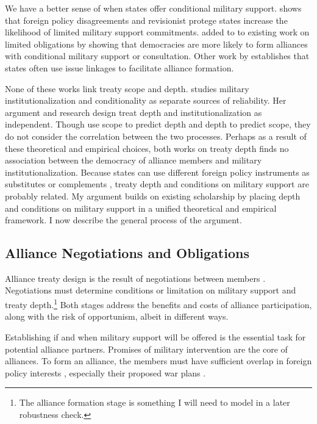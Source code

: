 \documentclass[12pt]{article}
\begin{document}
We have a better sense of when states offer conditional military support. 
\citet{Benson2012} shows that foreign policy disagreements and revisionist protege states increase the likelihood of limited military support commitments.
\citep{Chibaetal2015} added to to existing work on limited obligations by showing that democracies are more likely to form alliances with conditional military support or consultation. 
Other work by \citet{Poast2012, Poast2013} establishes that states often use issue linkages to facilitate alliance formation. 


None of these works link treaty scope and depth.  
\citet{Mattes2012} studies military institutionalization and conditionality as separate sources of reliability. 
Her argument and research design treat depth and institutionalization as independent.
Though \citet{BensonClinton2016} use scope to predict depth and depth to predict scope, they do not consider the correlation between the two processes. 
Perhaps as a result of these theoretical and empirical choices, both works on treaty depth finds no association between the democracy of alliance members and military institutionalization. 
Because states can use different foreign policy instruments as substitutes or complements \citep{Starr2000, MorganPalmer2000}, treaty depth and conditions on military support are probably related. 
My argument builds on existing scholarship by placing depth and conditions on military support in a unified theoretical and empirical framework. 
I now describe the general process of the argument. 


\subsection{Alliance Negotiations and Obligations}


Alliance treaty design is the result of negotiations between members \citep{Poast2019a}.  
Negotiations must determine conditions or limitation on military support and treaty depth.\footnote{The alliance formation stage is something I will need to model in a later robustness check.}
Both stages address the benefits and costs of alliance participation, along with the risk of opportunism, albeit in different ways. 


Establishing if and when military support will be offered is the essential task for potential alliance partners. 
Promises of military intervention are the core of alliances. 
To form an alliance, the members must have sufficient overlap in foreign policy interests \citep{Morrow1991, Smith1995, FordhamPoast2014}, especially their proposed war plans \citep{Poast2019a}.  
\end{document}
